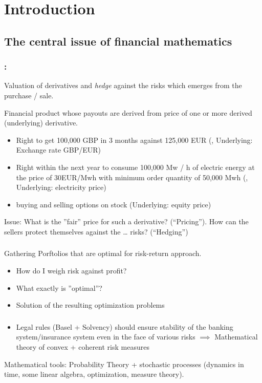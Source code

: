 ﻿\chapter{Introduction}
\section{The central issue of financial mathematics}
\subsection*{:}
Valuation of derivatives and \emph{hedge} against the risks which emerges from the purchase / sale.

\begin{*definition}
	Financial product whose payouts are derived from price of one or more  derived (underlying) derivative.
\end{*definition}
\begin{*example}
	\begin{itemize}
		\item Right to get 100,000 GBP in 3 months against 125,000 EUR (, Underlying: Exchange rate GBP/EUR)
		\item Right within the next year to consume 100,000 Mw / h of electric energy at the price of 30EUR/Mwh with minimum order quantity of 50,000 Mwh (, Underlying: electricity price)
		\item buying and selling options on stock (Underlying: equity price)
	\end{itemize}
\end{*example}
Issue:  What is the ''fair'' price for such a derivative? (``Pricing''). How can the sellers protect themselves against the … risks? (``Hedging'')
\subsection*{}
Gathering Porftolios that are optimal for risk-return approach.
\begin{itemize}
	\item How do I weigh risk against profit?
    \item What exactly is ''optimal''?
    \item Solution of the resulting optimization problems
\end{itemize}
\subsection*{}
\begin{itemize}
	\item Legal rules (Basel + Solvency) should ensure stability of the banking system/insurance system even in the face of various risks $\implies$ Mathematical theory of convex + coherent risk measures
\end{itemize}
Mathematical tools: Probability Theory + stochastic processes (dynamics in time, some linear algebra, optimization, measure theory).
